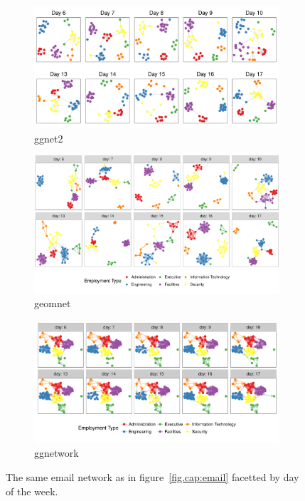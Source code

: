 \begin{figure}[hbt]
\begin{subfigure}[t]{\textwidth}
\caption{ggnet2}\label{email:ggnet2}
\includegraphics[width=\textwidth]{figure/email_facet_ggnet2-1.pdf}
\end{subfigure}
%
\begin{subfigure}[t]{\textwidth}
\caption{geomnet}
\includegraphics[width=\textwidth]{figure/email_facet_geom_net-1.pdf}
\end{subfigure}
%
\begin{subfigure}[t]{\textwidth}
\caption{ggnetwork}
\includegraphics[width=\textwidth]{figure/email_facet_ggnetwork-1.pdf}
\end{subfigure}

\caption{\label{fig:email_facet} The same email network as in figure~\ref{fig.cap:email} facetted by day of the week.}
\end{figure}
